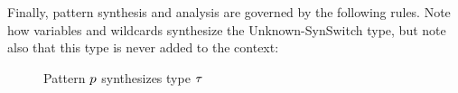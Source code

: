 \begin{mathpar}
   
\end{mathpar}
Finally, pattern synthesis and analysis are governed by the following rules. Note how variables and wildcards synthesize the Unknown-SynSwitch type, but note also that this type is never added to the context:

\begin{figure}[htbp]
  \raggedright
  \judgbox{\ensuremath{\ctxSynPat{\Gamma}{\PMV}{\TMV}}} Pattern $\PMV$ synthesizes type $\TMV$
  \begin{mathpar}
   
   

  \end{mathpar}
  \label{fig:calculus-pattern-synthesis}
\end{figure}


